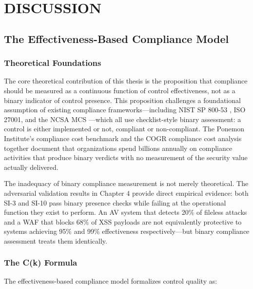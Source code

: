 \documentclass[12pt,oneside]{report}
\begin{document}
\chapter{DISCUSSION}

\section{The Effectiveness-Based Compliance Model}
\label{sec:effectiveness_model}

\subsection{Theoretical Foundations}

The core theoretical contribution of this thesis is the proposition that compliance should be measured as a continuous function of control effectiveness, not as a binary indicator of control presence. This proposition challenges a foundational assumption of existing compliance frameworks—including NIST SP 800-53 \cite{nist2020}, ISO 27001, and the NCSA MCS \cite{ncsa2023}—which all use checklist-style binary assessment: a control is either implemented or not, compliant or non-compliant. The Ponemon Institute's compliance cost benchmark \cite{ponemon_cost} and the COGR compliance cost analysis \cite{cogr_report} together document that organizations spend billions annually on compliance activities that produce binary verdicts with no measurement of the security value actually delivered.

The inadequacy of binary compliance measurement is not merely theoretical. The adversarial validation results in Chapter 4 provide direct empirical evidence: both SI-3 and SI-10 pass binary presence checks while failing at the operational function they exist to perform. An AV system that detects 20\% of fileless attacks and a WAF that blocks 68\% of XSS payloads are not equivalently protective to systems achieving 95\% and 99\% effectiveness respectively—but binary compliance assessment \cite{nist2020} treats them identically.

\subsection{The C(k) Formula}

The effectiveness-based compliance model formalizes control quality as:
\end{document}
